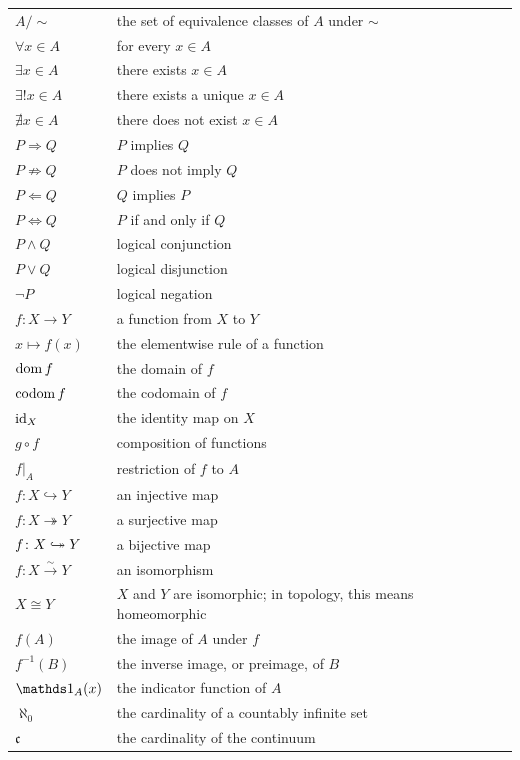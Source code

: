 {\begin{longtable}{@{}L{0.27\textwidth}L{0.65\textwidth}@{}}
        $A/\sim$ & the set of equivalence classes of $A$ under $\sim$ \\
        $\forall x\in A$ & for every $x\in A$ \\
        $\exists x\in A$ & there exists $x\in A$ \\
        $\exists!x\in A$ & there exists a unique $x\in A$ \\
        $\nexists x\in A$ & there does not exist $x\in A$ \\
        $P\Rightarrow Q$ & $P$ implies $Q$ \\
        $P\nRightarrow Q$ & $P$ does not imply $Q$ \\
        $P\Leftarrow Q$ & $Q$ implies $P$ \\
        $P\Leftrightarrow Q$ & $P$ if and only if $Q$ \\
        $P\land Q$ & logical conjunction \\
        $P\lor Q$ & logical disjunction \\
        $\neg P$ & logical negation \\
        $f\colon X\to Y$ & a function from $X$ to $Y$ \\
        $x\mapsto f(x)$ & the elementwise rule of a function \\
        $\operatorname{dom} f$ & the domain of $f$ \\
        $\operatorname{codom} f$ & the codomain of $f$ \\
        $\operatorname{id}_X$ & the identity map on $X$ \\
        $g\circ f$ & composition of functions \\
        $f|_A$ & restriction of $f$ to $A$ \\
        $f\colon X\hookrightarrow Y$ & an injective map \\
        $f\colon X\twoheadrightarrow Y$ & a surjective map \\
        $f\colon X\bijarrow Y$ & a bijective map \\
        $f\colon X\xrightarrow{\sim}Y$ & an isomorphism \\
        $X\cong Y$ & $X$ and $Y$ are isomorphic; in topology, this means homeomorphic \\
        $f(A)$ & the image of $A$ under $f$ \\
        $f^{-1}(B)$ & the inverse image, or preimage, of $B$ \\
        $\indicator{A}(x)$ & the indicator function of $A$ \\
        $\aleph_0$ & the cardinality of a countably infinite set \\
        $\mathfrak{c}$ & the cardinality of the continuum \\
    \end{longtable}
    }

